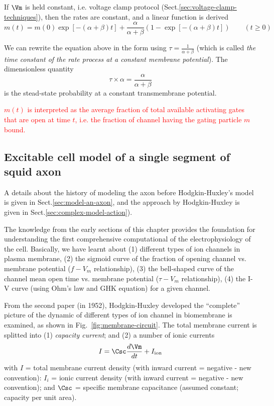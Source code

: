 If $\Vm$ is held constant, i.e. voltage clamp protocol
(Sect.\ref{sec:voltage-clamp-techniques}), then the rates are constant, and
a linear function is derived
\begin{equation}
m(t) = m(0) \exp\left[ -(\alpha + \beta) t \right] + \frac{\alpha}{\alpha +
\beta}(1 - \exp\left[ -(\alpha + \beta) t \right])   \qquad (t\geq 0)
\end{equation}

We can rewrite the equation above in the form using $\tau=\frac{1}{\alpha+
\beta}$ (which is called {\it the time constant of the rate process at a
constant membrane potential}).  The dimensionless quantity
\begin{equation}
\tau \times \alpha = \frac{\alpha}{\alpha + \beta}
\end{equation}
is the stead-state probability at a constant transmembrane potential.

\textcolor{red}{$m(t)$ is interpreted as the average fraction of total available
activating gates that are open at time $t$, i.e. the fraction of channel having
the gating particle $m$ bound.}




\subsection{Excitable cell model of a single segment of squid axon}


A details about the history of modeling the axon before Hodgkin-Huxley's model
is given in Sect.\ref{sec:model-an-axon}, and the approach by Hodgkin-Huxley is
given in Sect.\ref{sec:complex-model-action}).


The knowledge from the early sections of this chapter provides the foundation
for understanding the first comprehensive computational of the electrophysiology
of the cell. Basically, we have learnt about (1) different types of ion channels
in plasma membrane, (2) the sigmoid curve of the fraction of opening channel vs.
membrane potential ($f-V_m$ relationship), (3) the bell-shaped curve of the
channel mean open time vs. membrane potential ($\tau-V_m$ relationship), (4) the
I-V  curve (using Ohm's law and GHK equation) for a given channel.


From the second paper (in 1952), Hodgkin-Huxley developed the ``complete''
picture of the dynamic of different types of ion channel in biomembrane is
examined, as shown in Fig.~\ref{fig:membrane-circuit}.
The total membrane current is splitted into (1) {\it capacity current}; and (2)
a number of ionic currents 
\begin{equation}
I = \Csc \frac{d\Vm}{dt} + I_{\ion}
\end{equation}
with $I$ = total membrane current density (with inward current = negative - new
convention): $I_i$ = ionic current density (with inward current = negative -
new convention); and $\Csc$ = specific membrane capacitance (assumed constant;
capacity per unit area).


